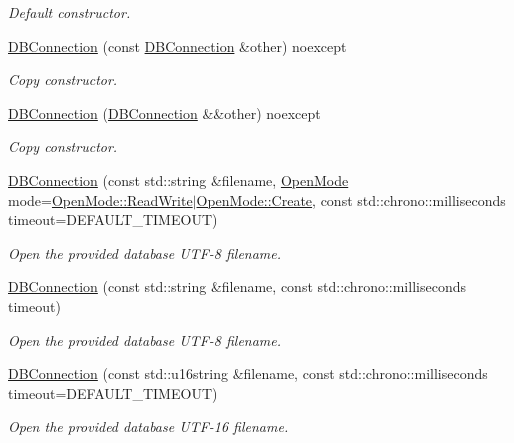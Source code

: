\begin{DoxyCompactItemize}
\begin{DoxyCompactList}\small\item\em Default constructor. \end{DoxyCompactList}\item 
\hyperlink{a00004_ab3dbee23694c323481260b84ff901403}{D\-B\-Connection} (const \hyperlink{a00004}{D\-B\-Connection} \&other) noexcept
\begin{DoxyCompactList}\small\item\em Copy constructor. \end{DoxyCompactList}\item 
\hyperlink{a00004_a41cc922e68047f709c25283b9d0176d5}{D\-B\-Connection} (\hyperlink{a00004}{D\-B\-Connection} \&\&other) noexcept
\begin{DoxyCompactList}\small\item\em Copy constructor. \end{DoxyCompactList}\item 
\hyperlink{a00004_acc17774b1187ee5b9706398d5ed7786b}{D\-B\-Connection} (const std\-::string \&filename, \hyperlink{a00038_a0d8721ab00cfcf85ba4eed715ccfecec}{Open\-Mode} mode=\hyperlink{a00038_a0d8721ab00cfcf85ba4eed715ccfececa70a2a84088d405a2e3f1e3accaa16723}{Open\-Mode\-::\-Read\-Write}$\vert$\hyperlink{a00038_a0d8721ab00cfcf85ba4eed715ccfececa686e697538050e4664636337cc3b834f}{Open\-Mode\-::\-Create}, const std\-::chrono\-::milliseconds timeout=D\-E\-F\-A\-U\-L\-T\-\_\-\-T\-I\-M\-E\-O\-U\-T)
\begin{DoxyCompactList}\small\item\em Open the provided database U\-T\-F-\/8 filename. \end{DoxyCompactList}\item 
\hyperlink{a00004_a62ddef495423a8da480a811c7f8bda1f}{D\-B\-Connection} (const std\-::string \&filename, const std\-::chrono\-::milliseconds timeout)
\begin{DoxyCompactList}\small\item\em Open the provided database U\-T\-F-\/8 filename. \end{DoxyCompactList}\item 
\hyperlink{a00004_a801e3c745e0236c2b55b91c47cc73da8}{D\-B\-Connection} (const std\-::u16string \&filename, const std\-::chrono\-::milliseconds timeout=D\-E\-F\-A\-U\-L\-T\-\_\-\-T\-I\-M\-E\-O\-U\-T)
\begin{DoxyCompactList}\small\item\em Open the provided database U\-T\-F-\/16 filename. \end{DoxyCompactList}\item 

\end{DoxyCompactItemize}
